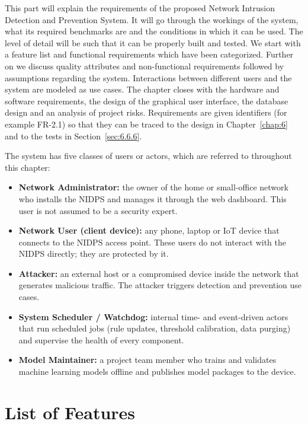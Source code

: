 \noindent This part will explain the requirements of the proposed Network Intrusion Detection and Prevention System. It will go through the workings of the system, what its required benchmarks are and the conditions in which it can be used. The level of detail will be such that it can be properly built and tested. We start with a feature list and functional requirements which have been categorized. Further on we discuss quality attributes and non-functional requirements followed by assumptions regarding the system. Interactions between different users and the system are modeled as use cases. The chapter closes with the hardware and software requirements, the design of the graphical user interface, the database design and an analysis of project risks. Requirements are given identifiers (for example FR-2.1) so that they can be traced to the design in Chapter~\ref{chap:6} and to the tests in Section~\ref{sec:6.6.6}.

\noindent The system has five classes of users or actors, which are referred to throughout this chapter:

\begin{itemize}
\item \textbf{Network Administrator:} the owner of the home or small-office network who installs the NIDPS and manages it through the web dashboard. This user is not assumed to be a security expert.
\item \textbf{Network User (client device):} any phone, laptop or IoT device that connects to the NIDPS access point. These users do not interact with the NIDPS directly; they are protected by it.
\item \textbf{Attacker:} an external host or a compromised device inside the network that generates malicious traffic. The attacker triggers detection and prevention use cases.
\item \textbf{System Scheduler / Watchdog:} internal time- and event-driven actors that run scheduled jobs (rule updates, threshold calibration, data purging) and supervise the health of every component.
\item \textbf{Model Maintainer:} a project team member who trains and validates machine learning models offline and publishes model packages to the device.
\end{itemize}

\section{List of Features}\label{sec:4.1}

